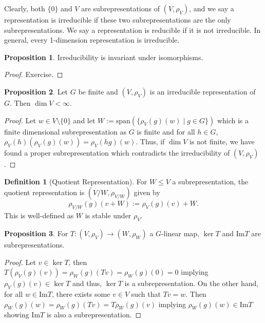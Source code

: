 \documentclass[]{article}
\theoremstyle{definition}
\theoremstyle{definition}
\newtheorem{definition}{Definition}[section]
\newtheorem{proposition}{Proposition}[section]
\begin{document}
Clearly, both \(\{0\}\) and \(V\) are subrepresentations of \((V, \rho_V)\), 
and we say a representation is irreducible if these two subrepresentations are 
the only subrepresentations. We say a representation is reducible if it is 
not irreducible. In general, every 1-dimension representation is irreducible.

\begin{proposition}
  Irreducibility is invariant under isomorphisms.
\end{proposition}
\begin{proof}
  Exercise.
\end{proof}

\begin{proposition}
  Let \(G\) be finite and \((V, \rho_V)\) is an irreducible representation 
  of \(G\). Then \(\dim V < \infty\).
\end{proposition}
\begin{proof}
  Let \(w \in V \setminus \{0\}\) and let 
  \(W := \text{span}(\{\rho_V(g)(w) \mid g \in G\})\) which is a finite dimensional 
  subrepresentation as \(G\) is finite and for all \(h \in G\), 
  \(\rho_V(h)(\rho_V(g)(w)) = \rho_V(hg)(w)\). Thus, if \(\dim V\) is not finite, 
  we have found a proper subrepresentation which contradicts the irreducibility 
  of \((V, \rho_V)\). 
\end{proof}

\begin{definition}[Quotient Representation]
  For \(W \le V\) a subrepresentation, the quotient representation 
  is \((V / W, \rho_{V / W})\) given by 
  \[\rho_{V / W}(g)(v + W) := \rho_V(g)(v) + W.\]
  This is well-defined as \(W\) is stable under \(\rho_V\).
\end{definition}

\begin{proposition}
  For \(T : (V, \rho_V) \to (W, \rho_W)\) a \(G\)-linear map, \(\ker T\) and 
  \(\text{Im} T\) are subrepresentations.
\end{proposition}
\begin{proof}
  Let \(v \in \ker T\), then \(T(\rho_V(g)(v)) = \rho_W(g)(Tv) = 
  \rho_W(g)(0) = 0\) implying \(\rho_V(g)(v) \in \ker T\) and thus, \(\ker T\) 
  is a subrepresentation. On the other hand, for all \(w \in \text{Im}T\), there 
  exists some \(v \in V\) such that \(Tv = w\). Then \(\rho_W(g)(w) = 
  \rho_W(g)(Tv) = T\rho_W(g)(v)\) implying \(\rho_W(g)(w) \in \text{Im}T\) 
  showing \(\text{Im}T\) is also a subrepresentation.
\end{proof}
\end{document}
